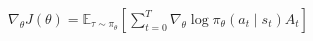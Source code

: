$\nabla_\theta J(\theta)=\mathbb{E}_{\tau\sim\pi_\theta}\left[\sum_{t=0}^{T}\nabla_\theta\log\pi_\theta(a_t\mid s_t)A_t\right]$
